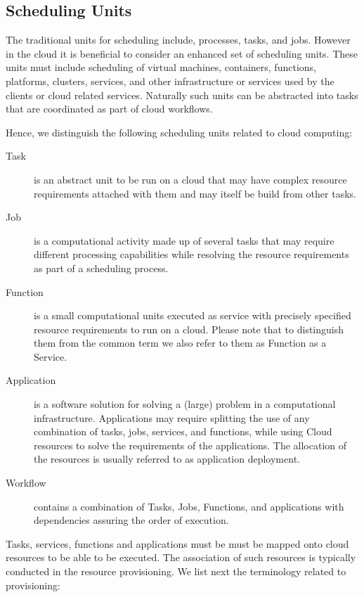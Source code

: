 \documentclass[final,5p,times,twocolumn]{elsarticle}
\begin{document}
\subsection{Scheduling Units}

The traditional units for scheduling include, processes, tasks, and
jobs. However in the cloud it is beneficial to consider an enhanced
set of scheduling units. These units must include scheduling of
virtual machines, containers, functions, platforms, clusters,
services, and other infrastructure or services used by the clients or
cloud related services. Naturally such units can be abstracted into
tasks that are coordinated as part of cloud workflows.

Hence, we distinguish the following scheduling units related to cloud
computing:

\begin{description}

\item[Task] is an abstract unit to be run on a cloud that may
  have complex resource requirements attached with them and may itself be
  build from other tasks. 

\item[Job] is a computational activity made up of several tasks
  that may require different processing capabilities while resolving
  the resource requirements as part of a scheduling process.

\item[Function] is a small computational units executed as
  service with precisely specified resource requirements to run on a
  cloud. Please note that to distinguish them from the common term we
  also refer to them as Function as a Service.

\item[Application] is a software solution for solving a (large)
  problem in a computational infrastructure. Applications may require
  splitting the use of any combination of tasks, jobs, services, and
  functions, while using Cloud resources to solve the requirements of
  the applications. The allocation of the resources is usually
  referred to as application deployment.

\item[Workflow] contains a combination of Tasks, Jobs,
  Functions, and applications with dependencies assuring the order of
  execution.

\end{description}

Tasks, services, functions and applications must be must be mapped
onto cloud resources to be able to be executed. The association of
such resources is typically conducted in the resource provisioning. We
list next the terminology related to provisioning:
\end{document}
